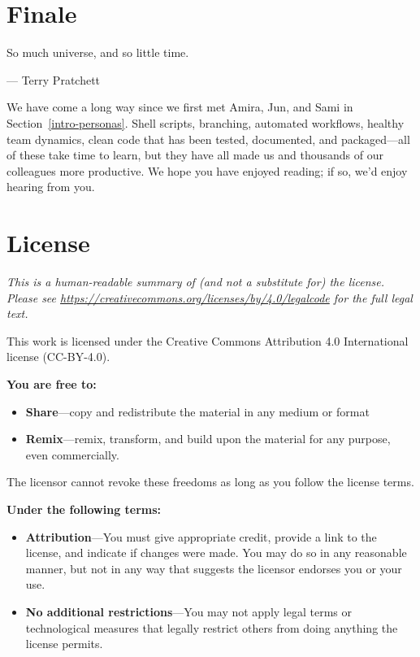 \documentclass[
]{krantz}
\renewenvironment{quote}{\begin{VF}}{\end{VF}}
\begin{document}
\hypertarget{finale}{%
\chapter{Finale}\label{finale}}

\begin{quote}
So much universe, and so little time.

--- Terry Pratchett
\end{quote}

We have come a long way since we first met Amira, Jun, and Sami in Section~\ref{intro-personas}.
Shell scripts,
branching,
automated workflows,
healthy team dynamics,
clean code that has been tested, documented, and packaged---all of these take time to learn,
but they have all made us and thousands of our colleagues more productive.
We hope you have enjoyed reading;
if so,
we'd enjoy hearing from you.

\hypertarget{appendix-appendix}{%
\appendix {}}


\hypertarget{license}{%
\chapter{License}\label{license}}

\emph{This is a human-readable summary of (and not a substitute for) the license.
Please see \url{https://creativecommons.org/licenses/by/4.0/legalcode} for the full legal text.}

This work is licensed under the Creative Commons Attribution 4.0
International license (CC-BY-4.0).

\textbf{You are free to:}

\begin{itemize}
\item
  \textbf{Share}---copy and redistribute the material in any medium or
  format
\item
  \textbf{Remix}---remix, transform, and build upon the material for any
  purpose, even commercially.
\end{itemize}

The licensor cannot revoke these freedoms as long as you follow the
license terms.

\textbf{Under the following terms:}

\begin{itemize}
\item
  \textbf{Attribution}---You must give appropriate credit, provide a link
  to the license, and indicate if changes were made. You may do so in
  any reasonable manner, but not in any way that suggests the licensor
  endorses you or your use.
\item
  \textbf{No additional restrictions}---You may not apply legal terms or
  technological measures that legally restrict others from doing
  anything the license permits.
\end{itemize}
\end{document}
